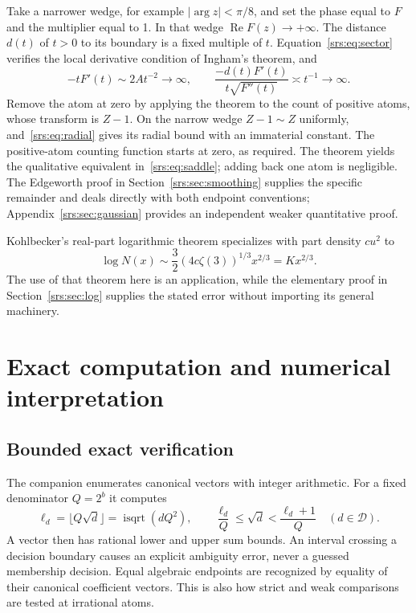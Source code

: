 \documentclass[11pt]{article}
\numberwithin{equation}{section}
\theoremstyle{remark}\newtheorem{remark}[theorem]{Remark}
\newcommand{\Sf}{\mathcal D}
\DeclareMathOperator{\Ree}{Re}
\begin{document}
Take a narrower wedge, for example $|\arg z|<\pi/8$, and set the phase equal to $F$ and the multiplier equal to 1. In that wedge $\Ree F(z)\to+\infty$. The distance $d(t)$ of $t>0$ to its boundary is a fixed multiple of $t$. Equation~\eqref{srs:eq:sector} verifies the local derivative condition of Ingham's theorem, and
\begin{equation}
 -tF'(t)\sim2At^{-2}\to\infty,\qquad
 \frac{-d(t)F'(t)}{t\sqrt{F''(t)}}\asymp t^{-1}\to\infty.
\end{equation}
Remove the atom at zero by applying the theorem to the count of positive atoms, whose transform is $Z-1$. On the narrow wedge $Z-1\sim Z$ uniformly, and~\eqref{srs:eq:radial} gives its radial bound with an immaterial constant. The positive-atom counting function starts at zero, as required. The theorem yields the qualitative equivalent in~\eqref{srs:eq:saddle}; adding back one atom is negligible. The Edgeworth proof in Section~\ref{srs:sec:smoothing} supplies the specific remainder and deals directly with both endpoint conventions; Appendix~\ref{srs:sec:gaussian} provides an independent weaker quantitative proof.

Kohlbecker's real-part logarithmic theorem specializes with part density $cu^2$ to
\[
 \log N(x)\sim\frac32(4c\zeta(3))^{1/3}x^{2/3}=Kx^{2/3}.
\]
The use of that theorem here is an application, while the elementary proof in Section~\ref{srs:sec:log} supplies the stated error without importing its general machinery.

\section{Exact computation and numerical interpretation}\label{srs:sec:computation}
\subsection{Bounded exact verification}
The companion enumerates canonical vectors with integer arithmetic. For a fixed denominator $Q=2^b$ it computes
\begin{equation}
 \ell_d=\lfloor Q\sqrt d\rfloor=\operatorname{isqrt}(dQ^2),\qquad
 \frac{\ell_d}{Q}\le\sqrt d<\frac{\ell_d+1}{Q}
 \quad(d\in\Sf).\label{srs:eq:rootenclosures}
\end{equation}
A vector then has rational lower and upper sum bounds. An interval crossing a decision boundary causes an explicit ambiguity error, never a guessed membership decision. Equal algebraic endpoints are recognized by equality of their canonical coefficient vectors. This is also how strict and weak comparisons are tested at irrational atoms.
\end{document}
